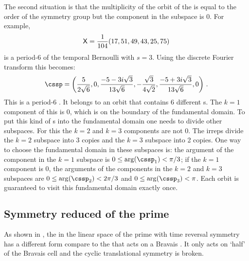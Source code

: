 The second situation is that the multiplicity of
the orbit of the {\lattstate} is equal to the order of the symmetry group
but the component in the subspace is 0. For example,
\[
\mathsf{X} = \frac{1}{104} (17, 51, 49, 43, 25, 75)
\]
is a period-6 {\lattstate} of the temporal Bernoulli
 with $s=3$. Using the discrete Fourier transform
this {\lattstate} becomes:
\[
\cssp =
\left(\frac{5}{2 \sqrt{6}},0,\frac{-5-3 i \sqrt{3}}{13
   \sqrt{6}},-\frac{\sqrt{3}}{4\sqrt{2}},\frac{-5+3 i \sqrt{3}}{13 \sqrt{6}},0\right) \,.
\]
This is a period-6 {\lattstate}. It belongs to an orbit that
contains 6 different {\lattstate}s. The $k=1$ component of this {\lattstate} is 0, which is on the boundary of the fundamental domain. To put this kind of
{\lattstate}s into the fundamental domain one needs to divide other subspaces.
For this {\lattstate} the $k=2$ and $k=3$ components are not 0. The irreps divide
the $k=2$ subspace into 3 copies and the $k=3$ subspace into 2 copies. One way to
choose the fundamental domain in these subspaces is: the argument of the component
in the $k=1$ subspace is $0\leq\arg(\cssp_{1})<\pi/3$; if the $k=1$ component
is 0, the arguments of the components
in the $k=2$ and $k=3$ subspaces are $0\leq\arg(\cssp_{2})<2\pi/3{}$ and
$0\leq\arg(\cssp_{3})<\pi$. Each orbit is guaranteed to visit this fundamental
domain exactly once.

\subsection{Symmetry reduced {\jacobianOrbs} of the prime {\lattstate}}
\label{sect:SymmReducedJacobian}
As shown in , the {\jacobianOrb} in the linear space of the prime
{\lattstate} with time reversal symmetry has a different form compare to the {\jacobianOrb}
 that acts on a Bravais {\lattstate}. It only acts on `half' of the Bravais cell and the 
cyclic translational symmetry is broken.

